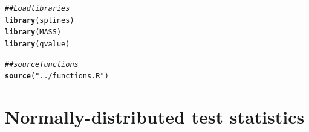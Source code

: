 \documentclass{article}\usepackage[]{graphicx}\usepackage[]{color}
\makeatletter
\newcommand{\hlstr}[1]{\textcolor[rgb]{0.192,0.494,0.8}{#1}}%
\newcommand{\hlcom}[1]{\textcolor[rgb]{0.678,0.584,0.686}{\textit{#1}}}%
\newcommand{\hlstd}[1]{\textcolor[rgb]{0.345,0.345,0.345}{#1}}%
\newcommand{\hlkwd}[1]{\textcolor[rgb]{0.737,0.353,0.396}{\textbf{#1}}}%
\newenvironment{kframe}{%
 \def\at@end@of@kframe{}%
 \ifinner\ifhmode%
  \def\at@end@of@kframe{\end{minipage}}%
  \begin{minipage}{\columnwidth}%
 \fi\fi%
 \def\FrameCommand##1{\hskip\@totalleftmargin \hskip-\fboxsep
 \colorbox{shadecolor}{##1}\hskip-\fboxsep
     \hskip-\linewidth \hskip-\@totalleftmargin \hskip\columnwidth}%
 \MakeFramed {\advance\hsize-\width
   \@totalleftmargin\z@ \linewidth\hsize
   \@setminipage}}%
 {\par\unskip\endMakeFramed%
 \at@end@of@kframe}
\newenvironment{knitrout}{}{} %
\makeatother
\begin{document}



\begin{knitrout}
\color{fgcolor}\begin{kframe}
\begin{alltt}
\hlcom{## Load libraries}
\hlkwd{library}\hlstd{(splines)}
\hlkwd{library}\hlstd{(MASS)}
\hlkwd{library}\hlstd{(qvalue)}

\hlcom{##source functions}
\hlkwd{source}\hlstd{(}\hlstr{"../functions.R"}\hlstd{)}
\end{alltt}
\end{kframe}
\end{knitrout}

\section{Normally-distributed test statistics}
\end{document}
